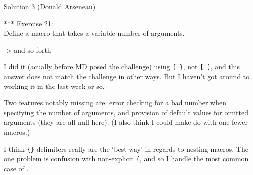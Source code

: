 \begin{solution}{Solution 3 (Donald Arseneau)}


*** Exercise 21: \\
Define a macro that takes a variable number of arguments. 
\begin{lcode}
 -> and so forth
\end{lcode}

I did it (acually before MD posed the challenge) 
using \verb?{ }?, not \verb?[ ]?, and this answer does not match the challenge 
in other ways. But I haven't got around to working it in the last week or so.

    Two features notably missing are: error checking for a bad 
number when specifying the number of arguments, and provision 
of default values for omitted arguments (they are all null 
here). 
(I also think I could make do with one fewer 
\cmd{\MultiArgCollect} macros.)

    I think \verb?{}? delimiters really are the `best way' in regards to 
nesting macros. The one problem is confusion with 
non-explicit \verb?{?, and so I handle the most common case of \cmd{\bgroup}. 


\end{solution}


\indexintoc
\printindex




